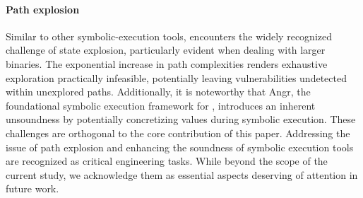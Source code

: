 \paragraph{\textbf{Path explosion}}
%
Similar to other symbolic-execution tools, \tool{} encounters the widely
recognized challenge of state explosion, particularly evident when dealing
with larger binaries.  The exponential increase in path complexities
renders exhaustive exploration practically infeasible, potentially leaving
vulnerabilities undetected within unexplored paths.  Additionally, it is
noteworthy that Angr, the foundational symbolic execution framework for
\tool{}, introduces an inherent unsoundness by potentially concretizing
values during symbolic execution. These challenges are orthogonal to the
core contribution of this paper. Addressing the issue of path explosion and
enhancing the soundness of symbolic execution tools are recognized as
critical engineering tasks.  While beyond the scope of the current study,
we acknowledge them as essential aspects deserving of attention in future
work.


